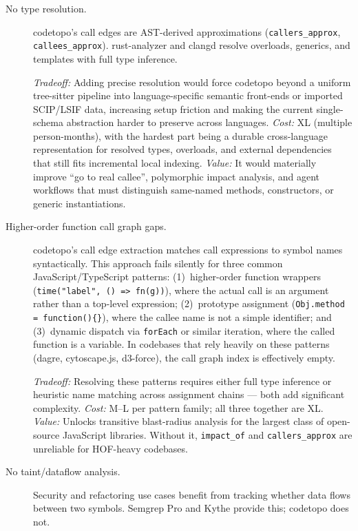 \begin{description}
  \item[No type resolution.] codetopo's call edges are AST-derived
        approximations (\texttt{callers\_approx}, \texttt{callees\_approx}).
        rust-analyzer and clangd resolve overloads, generics, and templates
        with full type inference.

        \emph{Tradeoff:} Adding precise resolution would force codetopo beyond a
        uniform tree-sitter pipeline into language-specific semantic front-ends
        or imported SCIP/LSIF data, increasing setup friction and making the
        current single-schema abstraction harder to preserve across languages.
        \emph{Cost:} XL (multiple person-months), with the hardest part being a
        durable cross-language representation for resolved types, overloads, and
        external dependencies that still fits incremental local indexing.
        \emph{Value:} It would materially improve ``go to real callee'',
        polymorphic impact analysis, and agent workflows that must distinguish
        same-named methods, constructors, or generic instantiations.
  \item[Higher-order function call graph gaps.] codetopo's call edge extraction
        matches call expressions to symbol names syntactically. This approach
        fails silently for three common JavaScript/TypeScript patterns:
        (1)~higher-order function wrappers
        (\texttt{time("label",\,() => fn(g))}), where the actual call is an
        argument rather than a top-level expression; (2)~prototype assignment
        (\texttt{Obj.method\,=\,function()\{\}}), where the callee name is not a
        simple identifier; and (3)~dynamic dispatch via \texttt{forEach} or
        similar iteration, where the called function is a variable. In codebases
        that rely heavily on these patterns (dagre, cytoscape.js, d3-force), the
        call graph index is effectively empty.

        \emph{Tradeoff:} Resolving these patterns requires either full type
        inference or heuristic name matching across assignment chains --- both
        add significant complexity. \emph{Cost:} M--L per pattern family; all
        three together are XL. \emph{Value:} Unlocks transitive blast-radius
        analysis for the largest class of open-source JavaScript libraries.
        Without it, \texttt{impact\_of} and \texttt{callers\_approx} are
        unreliable for HOF-heavy codebases.
  \item[No taint/dataflow analysis.] Security and refactoring use cases
        benefit from tracking whether data flows between two symbols. Semgrep
        Pro and Kythe provide this; codetopo does not.


\end{description}
